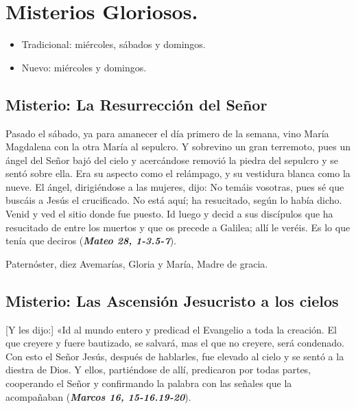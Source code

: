 \documentclass[./main.tex]{subfiles}
\newcounter{glorious-counter}
\begin{document}
\section*{Misterios Gloriosos.}
\begin{itemize}
      \item Tradicional: miércoles, sábados y domingos.
      \item Nuevo: miércoles y domingos.
\end{itemize}

\subsection*{ Misterio: La Resurrección del Señor}

Pasado el sábado, ya para amanecer el día primero de la semana, vino María Magdalena con la otra María al sepulcro. Y sobrevino un gran terremoto, 
pues un ángel del Señor bajó del cielo y acercándose removió la piedra del sepulcro y se sentó sobre ella. Era su aspecto como el relámpago, 
y su vestidura blanca como la nueve. El ángel, dirigiéndose a las mujeres, dijo: No temáis vosotras, pues sé que buscáis a Jesús el crucificado. 
No está aquí; ha resucitado, según lo había dicho. Venid y ved el sitio donde fue puesto. Id luego y decid a sus discípulos que ha resucitado de entre los muertos 
y que os precede a Galilea; allí le veréis. Es lo que tenía que deciros (\textbf{\emph{Mateo 28, 1-3.5-7}}).

\begin{center}
      Paternóster, diez Avemarías, Gloria y María, Madre de gracia.
\end{center}

\subsection*{ Misterio: Las Ascensión Jesucristo a los cielos}

[Y les dijo:] «Id al mundo entero y predicad el Evangelio a toda la creación. El que creyere y fuere bautizado, se salvará, mas el que no creyere, será condenado. 
Con esto el Señor Jesús, después de hablarles, fue elevado al cielo y se sentó a la diestra de Dios. Y ellos, partiéndose de allí, predicaron por todas partes, 
cooperando el Señor y confirmando la palabra con las señales que la acompañaban (\textbf{\emph{Marcos 16, 15-16.19-20}}).
\end{document}
